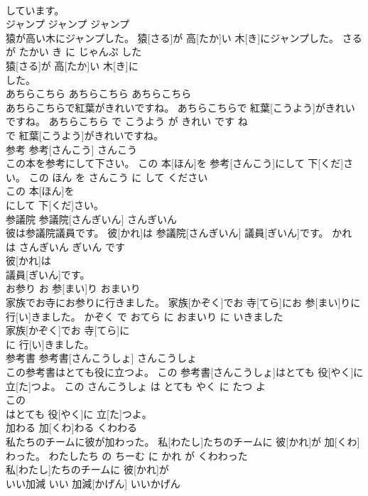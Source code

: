 \documentclass[8pt]{extreport}
\begin{document}
\begin{CJK}{UTF8}{min}
\\	しています。			
\\	ジャンプ	ジャンプ	ジャンプ	
\\	猿が高い木にジャンプした。	猿[さる]が 高[たか]い 木[き]にジャンプした。	さる が たかい き に じゃんぷ した	
\\	猿[さる]が 高[たか]い 木[き]に
\\	した。			
\\	あちらこちら	あちらこちら	あちらこちら	
\\	あちらこちらで紅葉がきれいですね。	あちらこちらで 紅葉[こうよう]がきれいですね。	あちらこちら で こうよう が きれい です ね	
\\	で 紅葉[こうよう]がきれいですね。			
\\	参考	参考[さんこう]	さんこう	
\\	この本を参考にして下さい。	この 本[ほん]を 参考[さんこう]にして 下[くだ]さい。	この ほん を さんこう に して ください	
\\	この 本[ほん]を
\\	にして 下[くだ]さい。			
\\	参議院	参議院[さんぎいん]	さんぎいん	
\\	彼は参議院議員です。	彼[かれ]は 参議院[さんぎいん] 議員[ぎいん]です。	かれ は さんぎいん ぎいん です	
\\	彼[かれ]は
\\	議員[ぎいん]です。			
\\	お参り	お 参[まい]り	おまいり	
\\	家族でお寺にお参りに行きました。	家族[かぞく]でお 寺[てら]にお 参[まい]りに 行[い]きました。	かぞく で おてら に おまいり に いきました	
\\	家族[かぞく]でお 寺[てら]に
\\	に 行[い]きました。			
\\	参考書	参考書[さんこうしょ]	さんこうしょ	
\\	この参考書はとても役に立つよ。	この 参考書[さんこうしょ]はとても 役[やく]に 立[た]つよ。	この さんこうしょ は とても やく に たつ よ	
\\	この
\\	はとても 役[やく]に 立[た]つよ。			
\\	加わる	加[くわ]わる	くわわる	
\\	私たちのチームに彼が加わった。	私[わたし]たちのチームに 彼[かれ]が 加[くわ]わった。	わたしたち の ちーむ に かれ が くわわった	
\\	私[わたし]たちのチームに 彼[かれ]が
\\	いい加減	いい 加減[かげん]	いいかげん	

\end{CJK}
\end{document}
